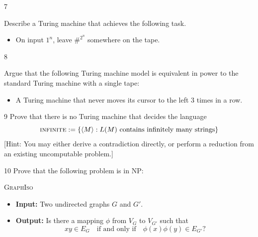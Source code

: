 \documentclass[12pt]{article}
\begin{document}
\begin{problem}{7}

    Describe a Turing machine that achieves the following task.
    \begin{itemize}
        \item On input $1^n$, leave $\#^{2^n}$ somewhere on the tape.
    \end{itemize}
\end{problem}

\begin{solution}
    \bbni

\end{solution}

\begin{problem}{8}

    Argue that the following Turing machine model is equivalent in power to the standard Turing machine with a single tape:
    \begin{itemize}
        \item A Turing machine that never moves its cursor to the left $3$ times in a row.
    \end{itemize}
\end{problem}

\begin{solution}
    \bbni

\end{solution}


\newpage 

\begin{problem}{9}
    Prove that there is no Turing machine that decides the language
    \[\textsc{infinite} := \{\langle M \rangle : L(M) \text{ contains infinitely many strings}\}\]
    [Hint: You may either derive a contradiction directly, or perform a reduction from an existing uncomputable problem.]
\end{problem}


\begin{problem}{10}
    Prove that the following problem is in NP:

    \begin{tcolorbox}
        \textsc{GraphIso}
        \begin{itemize}
            \item \textbf{Input:} Two undirected graphs $G$ and $G'$.
            \item \textbf{Output:} Is there a mapping $\phi$ from $V_G$ to $V_{G'}$ such that
            \[
            xy \in E_G
            \quad \text{if and only if} \quad
            \phi(x)\phi(y) \in E_{G'}?
            \]
        \end{itemize}
    \end{tcolorbox}
\end{problem}
\end{document}
